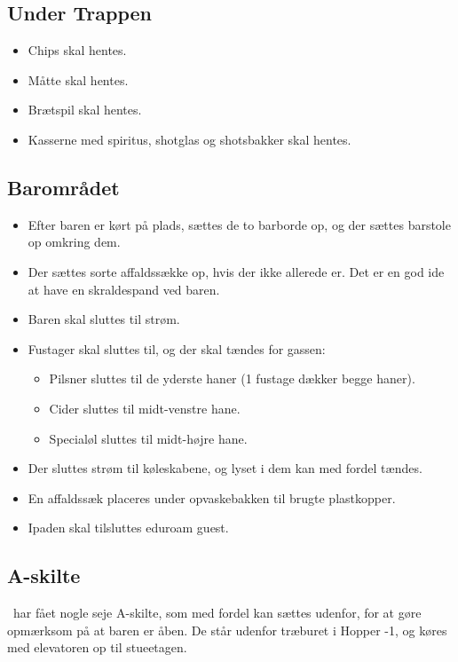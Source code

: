 \subsection{Under Trappen}
\label{sec:pre:under-trappen}

\begin{itemize}
	\item Chips skal hentes.
	\item Måtte skal hentes.
	\item Brætspil skal hentes.
	\item Kasserne med spiritus, shotglas og shotsbakker skal hentes.
\end{itemize}

\subsection{Barområdet}
\label{sec:pre:baromradet}

\begin{itemize}
	\item Efter baren er kørt på plads, sættes de to barborde op, og der sættes barstole op omkring dem.
	\item Der sættes sorte affaldssække op, hvis der ikke allerede er. 
		Det er en god ide at have en skraldespand ved baren.
	\item Baren skal sluttes til strøm.
	\item Fustager skal sluttes til, og der skal tændes for gassen:
		\begin{itemize}
		\item Pilsner sluttes til de yderste haner (1 fustage dækker begge
		haner).
		\item Cider sluttes til midt-venstre hane.
		\item Specialøl sluttes til midt-højre hane.
		\end{itemize}
	\item Der sluttes strøm til køleskabene, og lyset i dem kan med fordel tændes.
	\item En affaldssæk placeres under opvaskebakken til brugte plastkopper.
	\item Ipaden skal tilsluttes eduroam guest.
\end{itemize}

\subsection{A-skilte}
\label{sec:pre:a-skilte}
\fredagscafeen\ har fået nogle seje A-skilte, 
som med fordel kan sættes udenfor, 
for at gøre opmærksom på at baren er åben.
De står udenfor træburet i Hopper -1, og 
køres med elevatoren op til stueetagen.

